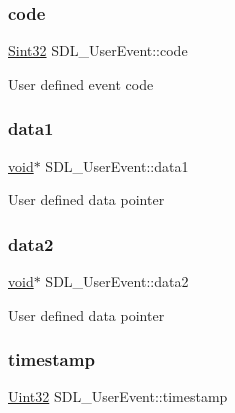 \subsubsection{\texorpdfstring{code}{code}}
{\footnotesize\ttfamily \hyperlink{_s_d_l__stdinc_8h_a7a90b941db9d4582e9ad7abb9940ff7e}{Sint32} S\+D\+L\+\_\+\+User\+Event\+::code}

User defined event code \mbox{\label{struct_s_d_l___user_event_ab2893a12be2f97195f16463a23107913}} 
\subsubsection{\texorpdfstring{data1}{data1}}
{\footnotesize\ttfamily \hyperlink{_s_d_l__opengles2__gl2ext_8h_ae5d8fa23ad07c48bb609509eae494c95}{void}$\ast$ S\+D\+L\+\_\+\+User\+Event\+::data1}

User defined data pointer \mbox{\label{struct_s_d_l___user_event_aae4dbf65c34d654c9edf519eb061b7cf}} 
\subsubsection{\texorpdfstring{data2}{data2}}
{\footnotesize\ttfamily \hyperlink{_s_d_l__opengles2__gl2ext_8h_ae5d8fa23ad07c48bb609509eae494c95}{void}$\ast$ S\+D\+L\+\_\+\+User\+Event\+::data2}

User defined data pointer \mbox{\label{struct_s_d_l___user_event_adbf1d34c73138a0c549310e5d4ad0c35}} 
\subsubsection{\texorpdfstring{timestamp}{timestamp}}
{\footnotesize\ttfamily \hyperlink{_s_d_l__stdinc_8h_add440eff171ea5f55cb00c4a9ab8672d}{Uint32} S\+D\+L\+\_\+\+User\+Event\+::timestamp}

\mbox{\label{struct_s_d_l___user_event_ab7afa8b98dbd7b52bef41155e10f7340}} 
